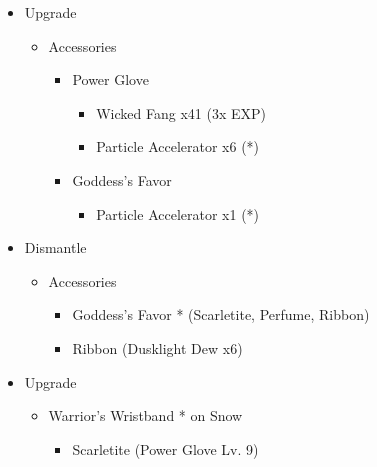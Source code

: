 \begin{upgrade}
	\begin{itemize}
		\item Upgrade
		      \begin{itemize}
			      \item Accessories
			            \begin{itemize}
				            \item Power Glove
				                  \begin{itemize}
					                  \item Wicked Fang x41 (3x EXP)
					                  \item Particle Accelerator x6 (*)
				                  \end{itemize}
				            \item Goddess's Favor
				                  \begin{itemize}
					                  \item Particle Accelerator x1 (*)
				                  \end{itemize}
			            \end{itemize}
		      \end{itemize}
		\item Dismantle
		      \begin{itemize}
			      \item Accessories
			            \begin{itemize}
				            \item Goddess's Favor * (Scarletite, Perfume, Ribbon)
				            \item Ribbon (Dusklight Dew x6)
			            \end{itemize}
		      \end{itemize}
		\item Upgrade
		      \begin{itemize}
			      \item Warrior's Wristband * on Snow
			            \begin{itemize}
				            \item Scarletite (Power Glove Lv. 9)
			            \end{itemize}
		      \end{itemize}
	\end{itemize}
\end{upgrade}
